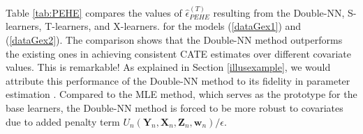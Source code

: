 \documentclass[11pt]{article}
\newcommand{\bX}{{\boldsymbol X}}
\newcommand{\bY}{{\boldsymbol Y}}
\newcommand{\bx}{{\boldsymbol x}}
\newcommand{\bZ}{{\boldsymbol Z}}
\newcommand{\bw}{{\boldsymbol w}}
\newcommand{\btheta}{{\boldsymbol \theta}}
\begin{document}
Table \ref{tab:PEHE} compares the values of $\hat{\epsilon}_{PEHE}^{(T)}$ 
resulting from the Double-NN, S-learners, T-learners, and X-learners. 
 for the models (\ref{dataGex1}) and (\ref{dataGex2}).
The comparison shows that the Double-NN method outperforms the existing ones in achieving 
consistent CATE estimates over different covariate values.  This is remarkable!
As explained in Section \ref{illusexample}, we would attribute this performance of the Double-NN method to its fidelity in parameter estimation \citep{LiangKS2024EFI}. 
Compared to the MLE method, which serves as the prototype for the base learners, 
the Double-NN method is forced to be more robust to covariates due to 
added penalty term $U_n(\bY_n,\bX_n,\bZ_n, \bw_n)/\epsilon$.


 




\end{document}
